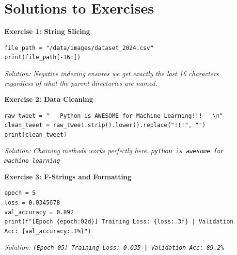 \section{Solutions to Exercises}

\textbf{Exercise 1: String Slicing}
\begin{lstlisting}
file_path = "/data/images/dataset_2024.csv"
print(file_path[-16:])
\end{lstlisting}
\textit{Solution: Negative indexing ensures we get exactly the last 16 characters regardless of what the parent directories are named.}

\vspace{1em}
\textbf{Exercise 2: Data Cleaning}
\begin{lstlisting}
raw_tweet = "   Python is AWESOME for Machine Learning!!!   \n"
clean_tweet = raw_tweet.strip().lower().replace("!!!", "")
print(clean_tweet)
\end{lstlisting}
\textit{Solution: Chaining methods works perfectly here. \texttt{python is awesome for machine learning}}

\vspace{1em}
\textbf{Exercise 3: F-Strings and Formatting}
\begin{lstlisting}
epoch = 5
loss = 0.0345678
val_accuracy = 0.892
print(f"[Epoch {epoch:02d}] Training Loss: {loss:.3f} | Validation Acc: {val_accuracy:.1%}")
\end{lstlisting}
\textit{Solution: \texttt{[Epoch 05] Training Loss: 0.035 | Validation Acc: 89.2\%}}
